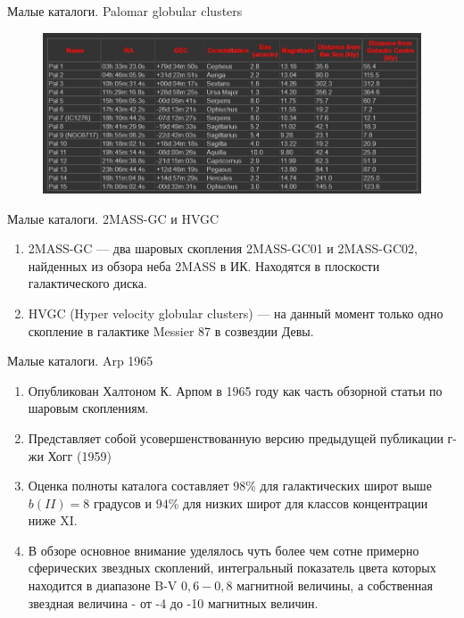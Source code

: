 \documentclass{beamer}
\begin{document}
    \begin{frame}{Малые каталоги. Palomar globular clusters}
        \begin{figure}[h]
            \centering
            \includegraphics[width=0.9\linewidth]{pictures/PGC.jpg}
        \end{figure}
    \end{frame}
    \begin{frame}{Малые каталоги. 2MASS-GC и HVGC}
        \begin{enumerate}[]
            \item 2MASS-GC --- два шаровых скопления 2MASS-GC01 и 2MASS-GC02, найденных из обзора неба 2MASS в ИК. Находятся в плоскости галактического диска.
            \item HVGC (Hyper velocity globular clusters) --- на данный момент только одно скопление в галактике Messier 87 в созвездии Девы. 
        \end{enumerate}
    \end{frame}
    \begin{frame}{Малые каталоги. Arp 1965}
        \begin{enumerate}[]
            \item Опубликован Халтоном К. Арпом в 1965 году как часть обзорной статьи по шаровым скоплениям.
            \item Представляет собой усовершенствованную версию предыдущей публикации г-жи Хогг (1959)\cite{Hogg1959}
            \item Оценка полноты каталога составляет $98$\% для галактических широт выше $b(II) = 8$ градусов и $94$\% для низких широт для классов концентрации ниже XI.
            \item В обзоре основное внимание уделялось чуть более чем сотне примерно сферических звездных скоплений, интегральный показатель цвета которых находится в диапазоне B-V $0,6 - 0,8$ магнитной величины, а собственная звездная величина - от -4 до -10 магнитных величин.
        \end{enumerate}
    \end{frame}
\end{document}
